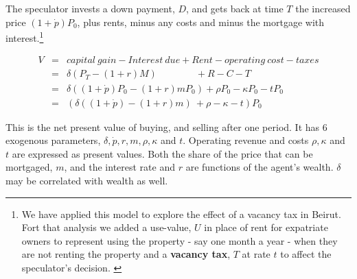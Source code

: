  The speculator  invests a down payment, $D$, and gets back at time $T$ the  increased price $(1+\dot p)P_0$, plus rents, minus any costs and minus the mortgage with interest.\footnote{We have applied this model to explore the effect of a vacancy tax in Beirut.  Fort that analysis we  added a use-value, $U$ in place of rent for expatriate owners to represent using the property - say one month a year - when they are not renting the property and a \textbf{vacancy tax}, $T$ at rate $t$ to affect the speculator's  decision. \cite{Al-Shihabi}}


\begin{eqnarray*}
V  	&=& capital\ gain - Interest\ due  	+ Rent  - operating\ cost -taxes\\
&=& \delta(P_T- (1+r)M) \qquad \qquad 	 + R  	-C   - T\\
&=& \delta((1+\dot p)  P_0- (1+r)mP_0)   + \rho P_0  	-\kappa P_0 - tP_0\\
&=&( \delta((1+\dot p)  - (1+r)m) \ + \rho   	-\kappa -t) P_0
\end{eqnarray*}

This is the  net present value of buying, and selling after one period. It has  6 exogenous parameters, $\delta, \dot p, r, m, \rho, \kappa$ and $t$.   Operating revenue and costs $\rho, \kappa$ and $t$ are expressed as  present values. Both the  share of the price  that can be mortgaged, $m$, and the interest rate  and $r$ are functions of the agent's wealth. $\delta$ may be correlated with wealth as well. 

